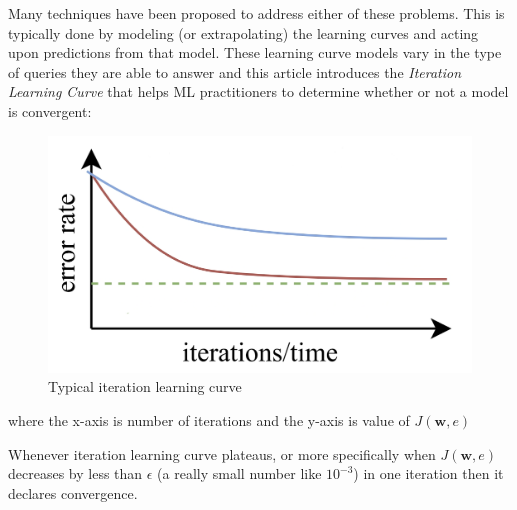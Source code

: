 \documentclass[12pt, twoside]{article}
\begin{document}
\begin{multicols*}{2}
			Many techniques have been proposed to address either of these problems. This is typically done by modeling (or extrapolating) the learning curves and acting upon predictions from that model. These learning curve models vary in the type of queries they are able to answer and this article introduces the \textit{Iteration Learning Curve} that helps ML practitioners to determine whether or not a model is convergent:
			\begin{figure}[H]
				\centering
				\includegraphics[width=\columnwidth]{learning-curve}
				\caption{Typical iteration learning curve\cite{mohr2022learning}}
				\label{fig:learning-curve}
			\end{figure}
			\noindent where the x-axis is number of iterations and the y-axis is value of $J(\mathbf{w},e)$
			
			Whenever iteration learning curve plateaus, or more specifically when $J(\mathbf{w},e)$ decreases by less than $\epsilon$ (a really small number like $10^{-3}$) in one iteration then it declares convergence.
			

\end{multicols*}
\end{document}
